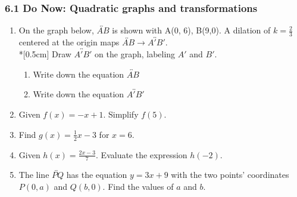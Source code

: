 \documentclass[12pt, twoside]{article}
\begin{document}
\subsubsection*{6.1 Do Now: Quadratic graphs and transformations}
  \begin{enumerate}


\item On the graph below, $\overleftrightarrow{AB}$ is shown with A(0, 6), B(9,0). A dilation of $k=\frac{2}{3}$ centered at the origin maps $\overleftrightarrow{AB} \rightarrow \overleftrightarrow{A'B'}$.\\*[0.5cm]
  Draw $\overleftrightarrow{A'B'}$ on the graph, labeling $A'$ and $B'$.
    \begin{center}
    \end{center}
      \vspace{1cm}
    \begin{enumerate}
      \item Write down the equation $\overleftrightarrow{AB}$ \vspace{2cm}
      \item Write down the equation $\overleftrightarrow{A'B'}$
    \end{enumerate}
    
\newpage

  \item Given $f(x)=-x+1$. Simplify $f(5)$. \vspace{2cm}
  \item Find $g(x)=\frac{1}{2} x-3$ for $x=6$. \vspace{2.5cm}
  \item Given $\displaystyle h(x)=\frac{2x-3}{7}$. Evaluate the expression $h(-2)$. \vspace{3cm}

  \item The line $\overleftrightarrow{PQ}$ has the equation $y=3x+9$ with the two points' coordinates $P(0,a)$ and $Q(b,0)$. Find the values of $a$ and $b$. \vspace{5cm}


\end{enumerate}
\end{document}
